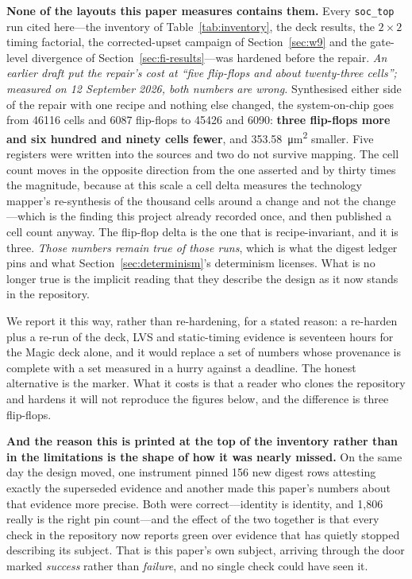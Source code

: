 \documentclass[11pt,a4paper]{article}
\newcommand{\file}[1]{\texttt{\small #1}}
\begin{document}
\textbf{None of the layouts this paper measures contains them.} Every
\file{soc\_top} run cited here---the inventory of
Table~\ref{tab:inventory}, the deck results, the $2\times2$ timing
factorial, the corrected-upset campaign of Section~\ref{sec:w9} and the
gate-level divergence of Section~\ref{sec:fi-results}---was hardened
before the repair. \emph{An earlier draft put the repair's cost at
``five flip-flops and about twenty-three cells''; measured on 12
September 2026, both numbers are wrong.} Synthesised either side of the
repair with one recipe and nothing else changed, the system-on-chip goes
from \num{46116} cells and \num{6087} flip-flops to \num{45426} and
\num{6090}: \textbf{three flip-flops more and six hundred and ninety
cells fewer}, and \SI{353.58}{\micro\meter\squared} smaller. Five
registers were written into the sources and two do not survive mapping.
The cell count moves in the opposite direction from the one asserted and
by thirty times the magnitude, because at this scale a cell delta
measures the technology mapper's re-synthesis of the thousand cells
around a change and not the change---which is the finding this project
already recorded once, and then published a cell count anyway. The
flip-flop delta is the one that is recipe-invariant, and it is three. \emph{Those numbers remain true of those runs}, which
is what the digest ledger pins and what
Section~\ref{sec:determinism}'s determinism licenses. What is no longer
true is the implicit reading that they describe the design as it now
stands in the repository.

We report it this way, rather than re-hardening, for a stated reason: a
re-harden plus a re-run of the deck, LVS and static-timing evidence is
seventeen hours for the Magic deck alone, and it would replace a set of
numbers whose provenance is complete with a set measured in a hurry
against a deadline. The honest alternative is the marker. What it costs
is that a reader who clones the repository and hardens it will not
reproduce the figures below, and the difference is three flip-flops.

\textbf{And the reason this is printed at the top of the inventory rather
than in the limitations is the shape of how it was nearly missed.} On the
same day the design moved, one instrument pinned 156 new digest rows
attesting exactly the superseded evidence and another made this paper's
numbers about that evidence more precise. Both were correct---identity is
identity, and 1{,}806 really is the right pin count---and the effect of
the two together is that every check in the repository now reports green
over evidence that has quietly stopped describing its subject. That is
this paper's own subject, arriving through the door marked \emph{success}
rather than \emph{failure}, and no single check could have seen it.
\end{document}
